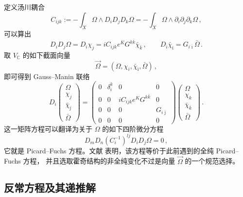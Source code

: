 定义汤川耦合
\begin{equation}
  C_{ijk}:=-\int_X\Omega\wedge D_iD_jD_k\Omega
  =-\int_X\Omega\wedge\partial_i\partial_j\partial_k\Omega\,,
  \tag{4.16}
  \label{eq:4.16}
\end{equation}
可以算出
\begin{equation}
  D_iD_j\Omega=D_i\chi_j=iC_{ijk}e^K G^{k\bar k}\bar\chi_{\bar k}\,,\qquad
  D_i\bar\chi_{\bar\imath}=G_{i\bar\imath}\bar\Omega\,.
  \tag{4.17}
  \label{eq:4.17}
\end{equation}
取 $V_{\mathbb{C}}$ 的如下截面向量
\begin{equation}
  \vec{\Omega}=(\Omega,\chi_i,\bar\chi_{\bar\imath},\bar\Omega)\,,
  \tag{4.18}
  \label{eq:4.18}
\end{equation}
即可得到 Gauss--Manin 联络
\begin{equation}
  D_i
  \begin{pmatrix}
    \Omega\\ \chi_j\\ \bar\chi_{\bar\jmath}\\ \bar\Omega
  \end{pmatrix}
  =
  \begin{pmatrix}
    0 & \delta^k_i & 0 & 0\\
    0 & 0 & iC_{ijk}e^K G^{k\bar k} & 0\\
    0 & 0 & 0 & G_{i\bar\jmath}\\
    0 & 0 & 0 & 0
  \end{pmatrix}
  \begin{pmatrix}
    \Omega\\ \chi_k\\ \bar\chi_{\bar k}\\ \bar\Omega
  \end{pmatrix}\,.
  \tag{4.19}
  \label{eq:4.19}
\end{equation}
这一矩阵方程可以翻译为关于 $\Omega$ 的如下四阶微分方程
\begin{equation}
  D_mD_n(C_i^{-1})^{lj}D_iD_j\Omega=0\,,
  \tag{4.20}
  \label{eq:4.20}
\end{equation}
它就是 Picard--Fuchs 方程。文献 \cite{ref58,ref51} 表明，该方程等价于此前遇到的全纯 Picard--Fuchs 方程，
并且选取霍奇结构的非全纯变化不过是向量 $\vec{\Omega}$ 的一个规范选择。

\subsection{反常方程及其递推解}
\label{sec:4.3}


